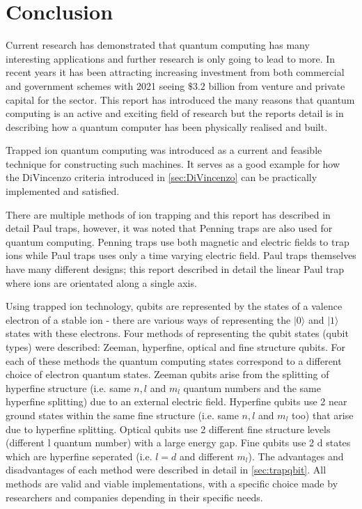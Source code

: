 \section{Conclusion}


Current research has demonstrated that quantum computing has many interesting applications and further research is only going to lead to more. 
In recent years it has been attracting increasing investment from both commercial and government schemes with 2021 seeing $\$ 3.2$ billion from venture and private capital for the sector. 
This report has introduced the many reasons that quantum computing is an active and exciting field of research but the reports detail is in describing how a quantum computer has been physically realised and built. 

Trapped ion quantum computing was introduced as a current and feasible technique for constructing such machines. It serves as a good example for how the DiVincenzo criteria introduced in \cref{sec:DiVincenzo} can be practically implemented and satisfied.

There are multiple methods of ion trapping and this report has described in detail Paul traps, however, it was noted that Penning traps are also used for quantum computing.
Penning traps use both magnetic and electric fields to trap ions while Paul traps uses only a time varying electric field. Paul traps themselves have many different designs; this report described in detail the linear Paul trap where ions are orientated along a single axis.

Using trapped ion technology, qubits are represented by the states of a valence electron of a stable ion - there are various ways of representing the $|0\rangle$ and $|1\rangle$ states with these electrons.
Four methods of representing the qubit states (qubit types) were described: Zeeman, hyperfine, optical and fine structure qubits. 
For each of these methods the quantum computing states correspond to a different choice of electron quantum states.
Zeeman qubits arise from the splitting of hyperfine structure (i.e. same $n, l$ and $m_l$ quantum numbers and the same hyperfine splitting) due to an external electric field. 
Hyperfine qubits use 2 near ground states within the same fine structure (i.e. same $n, l$ and $m_l$ too) that arise due to hyperfine splitting.
Optical qubits use 2 different fine structure levels (different l quantum number) with a large energy gap.
Fine qubits use 2 d states which are hyperfine seperated (i.e. $l=d$ and different $m_l$).
The advantages and disadvantages of each method were described in detail in \cref{sec:trapqbit}. All methods are valid and viable implementations, with a specific choice made by researchers and companies depending in their specific needs. 

